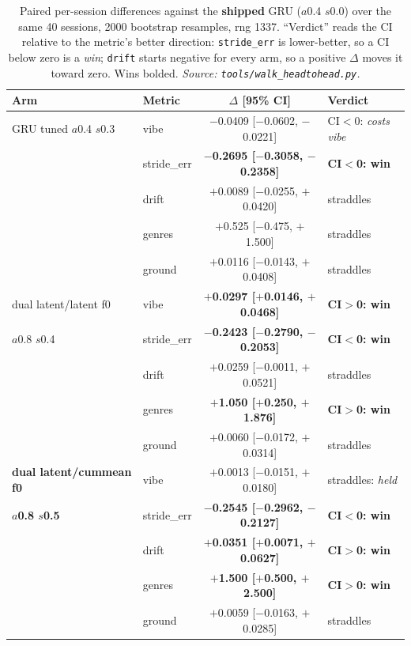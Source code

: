 \documentclass[11pt]{article}
\newcommand{\best}[1]{\textbf{#1}}
\begin{document}
\begin{table}[ht]
  \centering
  \caption{Paired per-session differences against the \textbf{shipped} GRU
  ($a$\num{0.4} $s$\num{0.0}) over the same \num{40} sessions, \num{2000}
  bootstrap resamples, rng \num{1337}. ``Verdict'' reads the CI relative to the
  metric's better direction: \texttt{stride\_err} is lower-better, so a CI below
  zero is a \emph{win}; \texttt{drift} starts negative for every arm, so a
  positive $\Delta$ moves it toward zero. Wins bolded.
  \emph{Source: \texttt{tools/walk\_headtohead.py}.}}
  \label{tab:walk-paired}
  {\footnotesize\setlength{\tabcolsep}{6pt}\begin{tabular}{llcl}
    \toprule
    Arm & Metric & $\Delta$ [95\% CI] & Verdict \\
    \midrule
    GRU tuned $a$\num{0.4} $s$\num{0.3} & vibe & $-$0.0409 [$-$0.0602, $-$0.0221] & CI$<$0: \emph{costs vibe} \\
     & stride\_err & \best{$-$0.2695 [$-$0.3058, $-$0.2358]} & \best{CI$<$0: win} \\
     & drift & $+$0.0089 [$-$0.0255, $+$0.0420] & straddles \\
     & genres & $+$0.525 [$-$0.475, $+$1.500] & straddles \\
     & ground & $+$0.0116 [$-$0.0143, $+$0.0408] & straddles \\
    \midrule
    dual latent/latent f0 & vibe & \best{$+$0.0297 [$+$0.0146, $+$0.0468]} & \best{CI$>$0: win} \\
    $a$\num{0.8} $s$\num{0.4} & stride\_err & \best{$-$0.2423 [$-$0.2790, $-$0.2053]} & \best{CI$<$0: win} \\
     & drift & $+$0.0259 [$-$0.0011, $+$0.0521] & straddles \\
     & genres & \best{$+$1.050 [$+$0.250, $+$1.876]} & \best{CI$>$0: win} \\
     & ground & $+$0.0060 [$-$0.0172, $+$0.0314] & straddles \\
    \midrule
    \best{dual latent/cummean f0} & vibe & $+$0.0013 [$-$0.0151, $+$0.0180] & straddles: \emph{held} \\
    \best{$a$\num{0.8} $s$\num{0.5}} & stride\_err & \best{$-$0.2545 [$-$0.2962, $-$0.2127]} & \best{CI$<$0: win} \\
     & drift & \best{$+$0.0351 [$+$0.0071, $+$0.0627]} & \best{CI$>$0: win} \\
     & genres & \best{$+$1.500 [$+$0.500, $+$2.500]} & \best{CI$>$0: win} \\
     & ground & $+$0.0059 [$-$0.0163, $+$0.0285] & straddles \\

\end{tabular}}
\end{table}
\end{document}
